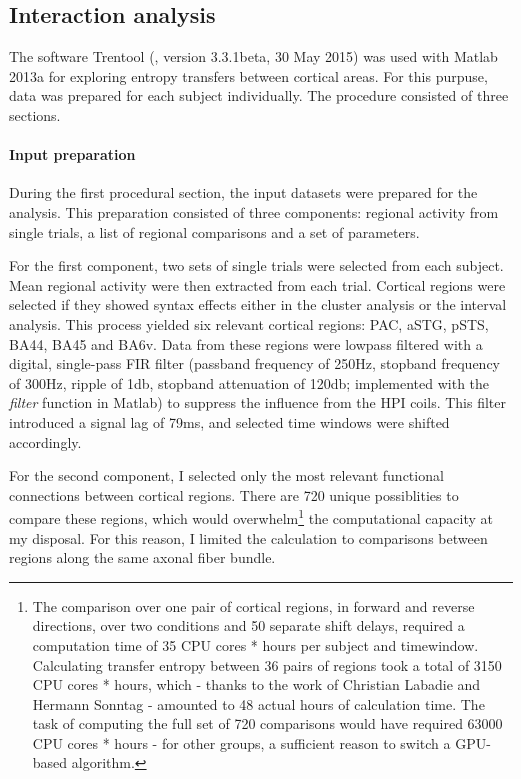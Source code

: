 \subsection{Interaction analysis}

The software Trentool (\cite{3.4.Trentool}, version 3.3.1beta, 30 May 2015) was used with Matlab 2013a for exploring entropy transfers between cortical areas.
For this purpuse, data was prepared for each subject individually.
The procedure consisted of three sections.

\paragraph{Input preparation}
During the first procedural section, the input datasets were prepared for the analysis.
This preparation consisted of three components: regional activity from single trials, a list of regional comparisons and a set of parameters.

For the first component, two sets of single trials were selected from each subject.
Mean regional activity were then extracted from each trial.
Cortical regions were selected if they showed syntax effects either in the cluster analysis or the interval analysis.
This process yielded six relevant cortical regions: PAC, aSTG, pSTS, BA44, BA45 and BA6v.
Data from these regions were lowpass filtered with a digital, single-pass FIR filter (passband frequency of 250Hz, stopband frequency of 300Hz, ripple of 1db, stopband attenuation of 120db; implemented with the \emph{filter} function in Matlab) to suppress the influence from the HPI coils.
This filter introduced a signal lag of 79ms, and selected time windows were shifted accordingly.

For the second component, I selected only the most relevant functional connections between cortical regions.
There are 720 unique possiblities to compare these regions, which would overwhelm\footnote{The comparison over one pair of cortical regions, in forward and reverse directions, over two conditions and 50 separate shift delays, required a computation time of 35 CPU cores * hours per subject and timewindow. Calculating transfer entropy between 36 pairs of regions took a total of 3150 CPU cores * hours, which - thanks to the work of Christian Labadie and Hermann Sonntag - amounted to 48 actual hours of calculation time. The task of computing the full set of 720 comparisons would have required 63000 CPU cores * hours - for other groups, a sufficient reason to switch a GPU-based algorithm\cite{3.4.gpuTE}.} the computational capacity at my disposal. For this reason, I limited the calculation to comparisons between regions along the same axonal fiber bundle.


